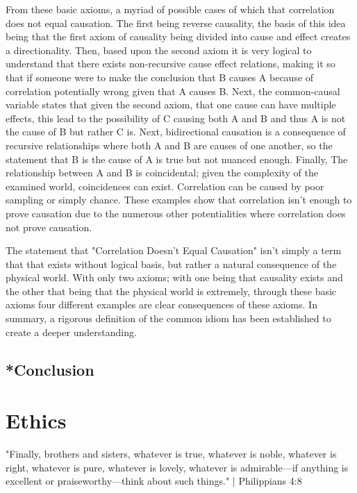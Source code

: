 \par From these basic axioms, a myriad of possible cases of which that correlation does not equal causation. The first being reverse causality, the basis of this idea being that the first axiom of causality being divided into cause and effect creates a directionality. Then, based upon the second axiom it is very logical to understand that there exists non-recursive cause effect relations, making it so that if someone were to make the conclusion that B causes A because of correlation potentially wrong given that A causes B. Next, the common-causal variable states that given the second axiom, that one cause can have multiple effects, this lead to the possibility of C causing both A and B and thus A is not the cause of B but rather C is. Next, bidirectional causation is a consequence of recursive relationships where both A and B are causes of one another, so the statement that B is the cause of A is true but not nuanced enough. Finally, The relationship between A and B is coincidental; given the complexity of the examined world, coincidences can exist. Correlation can be caused by poor sampling or simply chance. These examples show that correlation isn't enough to prove causation due to the numerous other potentialities where correlation does not prove causation.

\par The statement that "Correlation Doesn't Equal Causation" isn't simply a term that that exists without logical basis, but rather a natural consequence of the physical world. With only two axioms; with one being that causality exists and the other that being that the physical world is extremely, through these basic axioms four different examples are clear consequences of these axioms. In summary, a rigorous definition of the common idiom has been established to create a deeper understanding.

\section{*Conclusion}
\chapter{Ethics}
"Finally, brothers and sisters, whatever is true, whatever is noble, whatever is right, whatever is pure, whatever is lovely, whatever is admirable—if anything is excellent or praiseworthy—think about such things." | Philippians 4:8

